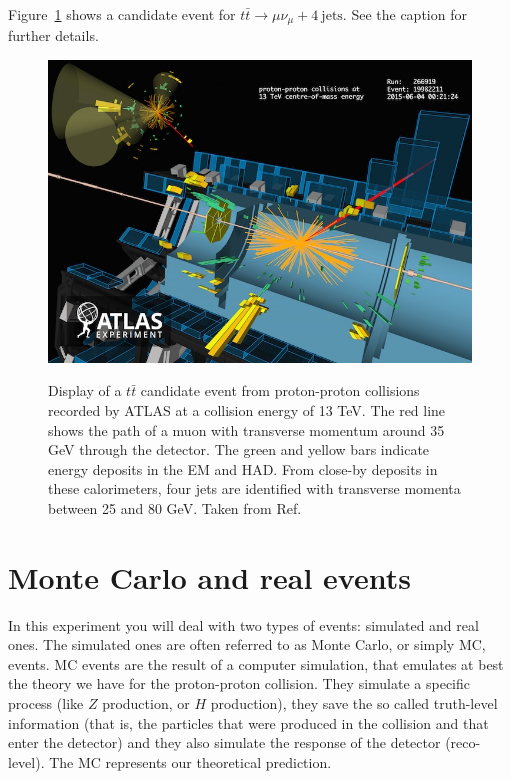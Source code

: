 Figure~\ref{fig:ttbar_eventdisplay} shows a candidate event for $t\bar{t} \rightarrow \mu \nu_{\mu} + 4\ \mathrm{jets}$. See the caption for further details. 

\begin{figure}[tb] 
	\centering
	\includegraphics[width=0.7\columnwidth]{Figures/ATLAS_ttbar_candidate_13TeV_VP1_run266919_evt19982211_thumb.jpg}
	\label{fig:ttbar_eventdisplay}
	\caption{Display of a $t\bar{t}$ candidate event from proton-proton collisions recorded by ATLAS at a collision energy of 13 TeV. The red line shows the path of a muon with transverse momentum around 35 GeV through the detector. The green and yellow bars indicate energy deposits in the EM and HAD. From close-by deposits in these calorimeters, four jets are identified with transverse momenta between 25 and 80 GeV. Taken from Ref.~\cite{ATLAS_ttbar_evtdisplay}}
\end{figure}

\section{Monte Carlo and real events}

In this experiment you will deal with two types of events: simulated and real ones. The simulated ones are often referred to as Monte Carlo, or simply MC, events. MC events are the result of a computer simulation, that emulates at best the theory we have for the proton-proton collision. They simulate a specific process (like $Z$ production, or $H$ production), they save the so called truth-level information (that is, the particles that were produced in the collision and that enter the detector) and they also simulate the response of the detector (reco-level). The MC represents our theoretical prediction. 


